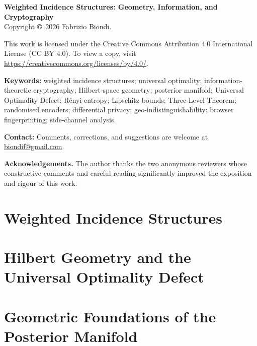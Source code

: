 \documentclass[12pt,a4paper]{book}
\theoremstyle{plain}
\begin{document}
\vfill
\noindent\small
\textbf{Weighted Incidence Structures: Geometry, Information, and Cryptography}\\
Copyright \copyright\ 2026 Fabrizio Biondi.

\medskip
\noindent This work is licensed under the Creative Commons
Attribution 4.0 International License
(CC BY 4.0).  To view a copy, visit
\url{https://creativecommons.org/licenses/by/4.0/}.

\medskip
\noindent \textbf{Keywords:} weighted incidence structures; universal optimality;
information-theoretic cryptography; Hilbert-space geometry; posterior
manifold; Universal Optimality Defect; R\'enyi entropy; Lipschitz
bounds; Three-Level Theorem; randomised encoders; differential privacy;
geo-indistinguishability; browser fingerprinting; side-channel analysis.

\medskip
\noindent \textbf{Contact:} Comments, corrections, and suggestions are
welcome at \url{biondif@gmail.com}.

\medskip
\noindent \textbf{Acknowledgements.} The author thanks the two anonymous
reviewers whose constructive comments and careful reading significantly
improved the exposition and rigour of this work.

\newpage

\tableofcontents

\mainmatter



\part{Weighted Incidence Structures}\label{ch:part:wis}






\part{Hilbert Geometry and the Universal Optimality Defect}\label{ch:part:hilbert}



\part{Geometric Foundations of the Posterior Manifold}\label{ch:part:posterior}





\end{document}
